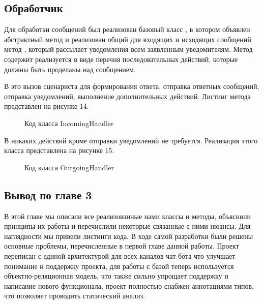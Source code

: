     \subsection{Обработчик}
    Для обработки сообщений был реализован базовый класс , в котором объявлен
    абстрактный метод  и реализован общий для входящих и исходящих сообщений
    метод , который рассылает уведомления всем заявленным уведомителям.
    Метод  содержит реализуется в виде перечня последовательных действий,
    которые должны быть проделаны над сообщением.

    В  это вызов сценариста для формирования ответа, отправка ответных сообщений,
    отправка уведомлений, выполнение дополнительных действий. Листинг метода представлен на рисунке 14.

    \begin{figure}[H]
        \centering
        
        \caption{Код класса IncomingHandler}
        \label{fig:incomig_handler_handle}
    \end{figure}

    В  никаких действий кроме отправки уведомлений не требуется.
    Реализация этого класса представлена на рисунке 15.

    \begin{figure}[H]
        \centering
        
        \caption{Код класса OutgoingHandler}
        \label{fig:outgoing_handler}
    \end{figure}

    \subsection*{Вывод по главе 3}
    В этой главе мы описали все реализованные нами классы и методы, объяснили принципы
    их работы и перечислили некоторые связанные с ними нюансы.
    Для наглядности мы привели листинги кода.
    В ходе самой разработки были решены основные проблемы, перечисленные в первой главе данной работы.
    Проект переписан с единой архитектурой для всех каналов чат-бота что улучшает понимание и поддержку
    проекта, для работы с базой теперь используется объектно-реляционная модель, что также сильно
    упрощает поддержку и написание нового функционала,
    проект полностью снабжен аннотациями типов, что позволяет проводить статический анализ.
